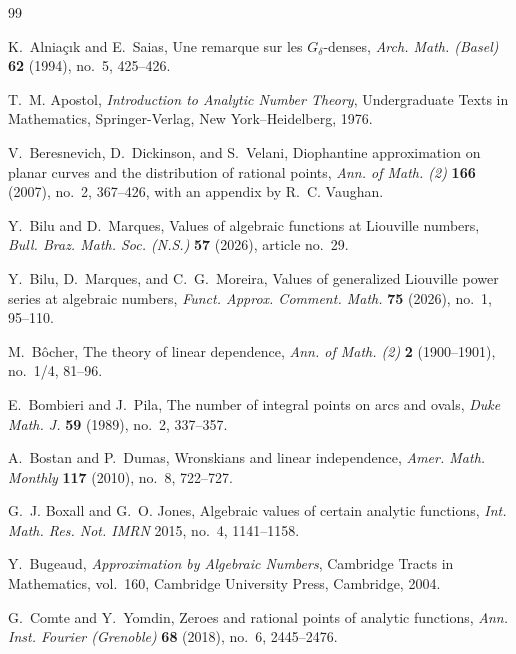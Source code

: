 \documentclass[11pt]{amsart}
\numberwithin{equation}{section}
\theoremstyle{definition}
\theoremstyle{remark}
\begin{document}
\begin{thebibliography}{99}

K.~Alnia\c{c}{\i}k and E.~Saias,
Une remarque sur les $G_\delta$-denses,
\emph{Arch. Math. (Basel)} \textbf{62} (1994), no.~5, 425--426.

T.~M. Apostol,
\emph{Introduction to Analytic Number Theory},
Undergraduate Texts in Mathematics,
Springer-Verlag, New York--Heidelberg, 1976.

V.~Beresnevich, D.~Dickinson, and S.~Velani,
Diophantine approximation on planar curves and the distribution of rational points,
\emph{Ann. of Math. (2)} \textbf{166} (2007), no.~2, 367--426,
with an appendix by R.~C. Vaughan.

Y.~Bilu and D.~Marques,
Values of algebraic functions at Liouville numbers,
\emph{Bull. Braz. Math. Soc. (N.S.)} \textbf{57} (2026), article no.~29.

Y.~Bilu, D.~Marques, and C.~G.~Moreira,
Values of generalized Liouville power series at algebraic numbers,
\emph{Funct. Approx. Comment. Math.} \textbf{75} (2026), no.~1,
95--110.

M.~B{\^o}cher,
The theory of linear dependence,
\emph{Ann. of Math. (2)} \textbf{2} (1900--1901), no.~1/4, 81--96.

E.~Bombieri and J.~Pila,
The number of integral points on arcs and ovals,
\emph{Duke Math. J.} \textbf{59} (1989), no.~2, 337--357.

A.~Bostan and P.~Dumas,
Wronskians and linear independence,
\emph{Amer. Math. Monthly} \textbf{117} (2010), no.~8, 722--727.

G.~J. Boxall and G.~O. Jones,
Algebraic values of certain analytic functions,
\emph{Int. Math. Res. Not. IMRN} 2015, no.~4, 1141--1158.

Y.~Bugeaud,
\emph{Approximation by Algebraic Numbers},
Cambridge Tracts in Mathematics, vol.~160,
Cambridge University Press, Cambridge, 2004.

G.~Comte and Y.~Yomdin,
Zeroes and rational points of analytic functions,
\emph{Ann. Inst. Fourier (Grenoble)} \textbf{68} (2018), no.~6, 2445--2476.



\end{thebibliography}
\end{document}
